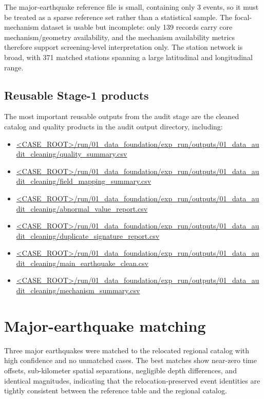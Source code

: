 \documentclass[11pt]{article}
\begin{document}
The major-earthquake reference file is small, containing only 3 events, so it must be treated as a sparse reference set rather than a statistical sample. The focal-mechanism dataset is usable but incomplete: only 139 records carry core mechanism/geometry availability, and the mechanism availability metrics therefore support screening-level interpretation only. The station network is broad, with 371 matched stations spanning a large latitudinal and longitudinal range.

\subsection{Reusable Stage-1 products}
The most important reusable outputs from the audit stage are the cleaned catalog and quality products in the audit output directory, including:
\begin{itemize}[leftmargin=*]
    \item \url{<CASE_ROOT>/run/01_data_foundation/exp_run/outputs/01_data_audit_cleaning/quality_summary.csv}
    \item \url{<CASE_ROOT>/run/01_data_foundation/exp_run/outputs/01_data_audit_cleaning/field_mapping_summary.csv}
    \item \url{<CASE_ROOT>/run/01_data_foundation/exp_run/outputs/01_data_audit_cleaning/abnormal_value_report.csv}
    \item \url{<CASE_ROOT>/run/01_data_foundation/exp_run/outputs/01_data_audit_cleaning/duplicate_signature_report.csv}
    \item \url{<CASE_ROOT>/run/01_data_foundation/exp_run/outputs/01_data_audit_cleaning/main_earthquake_clean.csv}
    \item \url{<CASE_ROOT>/run/01_data_foundation/exp_run/outputs/01_data_audit_cleaning/mechanism_summary.csv}
\end{itemize}

\section{Major-earthquake matching}
Three major earthquakes were matched to the relocated regional catalog with high confidence and no unmatched cases. The best matches show near-zero time offsets, sub-kilometer spatial separations, negligible depth differences, and identical magnitudes, indicating that the relocation-preserved event identities are tightly consistent between the reference table and the regional catalog.
\end{document}

